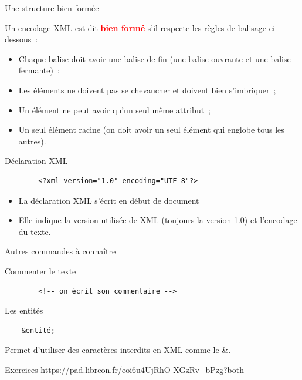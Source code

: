 \begin{frame}{Une structure bien formée}

Un encodage XML est dit \textcolor{red}{\textbf{bien formé}} s'il respecte les règles de balisage ci-dessous~:

\begin{itemize}
    \item Chaque balise doit avoir une balise de fin (une balise ouvrante et une balise fermante)~;
    \item Les éléments ne doivent pas se chevaucher et doivent bien s'imbriquer~;
    \item Un élément ne peut avoir qu'un seul même attribut~;
    \item Un seul élément racine (on doit avoir un seul élément qui englobe tous les autres).
\end{itemize}

\end{frame}


\begin{frame}[fragile]{Déclaration XML}
\begin{lstlisting}
        <?xml version="1.0" encoding="UTF-8"?>
    \end{lstlisting}

\begin{itemize}
    \item La déclaration XML s'écrit en début de document
    \item Elle indique la version utilisée de XML (toujours la version 1.0) et l'encodage du texte.
\end{itemize}
\end{frame}


\begin{frame}[fragile]{Autres commandes à connaître}
\begin{block}{Commenter le texte}
    \begin{lstlisting}
        <!-- on écrit son commentaire -->
    \end{lstlisting}
\end{block}

\begin{block}{Les entités}

\begin{verbatim}
    &entité;
\end{verbatim}
Permet d'utiliser des caractères interdits en XML comme le \&.
    
    
\end{block}
    
\end{frame}

\begin{frame}{Exercices}
    \url{https://pad.libreon.fr/eoi6u4UjRhO-XGzRv_bPzg?both}
\end{frame}

